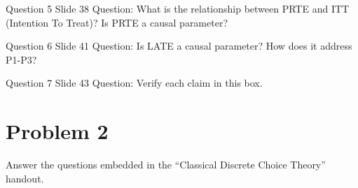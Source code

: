 \documentclass{article}
\begin{document}
\begin{problem}{Question 5 Slide 38}
Question: What is the relationship between PRTE and ITT (Intention To Treat)? Is PRTE a causal parameter?
\end{problem}
\begin{solution}
\end{solution}


\begin{problem}{Question 6 Slide 41}
Question: Is LATE a causal parameter? How does it address P1-P3?
\end{problem}
\begin{solution}
\end{solution}


\begin{problem}{Question 7 Slide 43}
Question: Verify each claim in this box.
\end{problem}
\begin{solution}
\end{solution}



\newpage
\section*{Problem 2}
Answer the questions embedded in the ``Classical Discrete Choice Theory'' handout.
\end{document}

